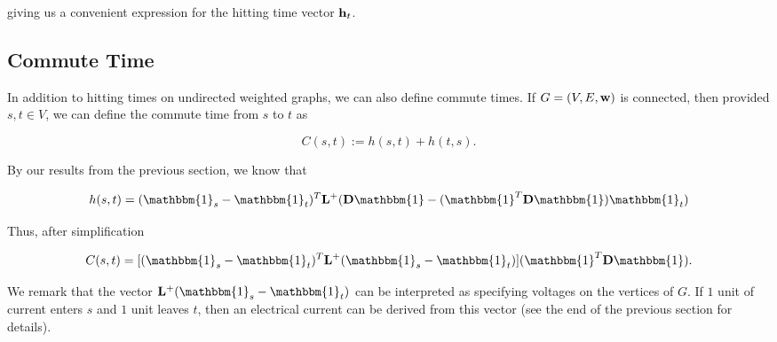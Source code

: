 \documentclass[11pt]{article}
\begin{document}
giving us a convenient expression for the hitting time vector $\V{h}_{t}$.

\subsection{Commute Time}


In addition to hitting times on undirected weighted graphs, we can also define commute
times. If $G=(V,E,\V{w})$ is connected, then provided $s,t \in V$, we can define
the commute time from $s$ to $t$ as

\[
	C(s,t):= h(s,t) +h(t,s).
\]

By our results from the previous section, we know that

\[
	h(s,t) = (\mathbbm{1}_{s}-\mathbbm{1}_{t})^{T} \V{L}^{+}(\V{D}\mathbbm{1} - (\mathbbm{1}^{T}\V{D}\mathbbm{1})\mathbbm{1}_{t})
\]

Thus, after simplification

\[
	C(s,t) = [(\mathbbm{1}_{s}-\mathbbm{1}_{t})^{T} \V{L}^{+} ( \mathbbm{1}_{s} - \mathbbm{1}_{t})](\mathbbm{1}^{T} \V{D}\mathbbm{1}).
\]

We remark that the vector  $\V{L}^{+} ( \mathbbm{1}_{s} - \mathbbm{1}_{t})$ can be interpreted as specifying voltages
on the vertices of $G$. If $1$ unit of current enters $s$ and $1$ unit leaves $t$, then an electrical current can be derived
from this vector (see the end of the previous section for details).






\printbibliography
\end{document}
